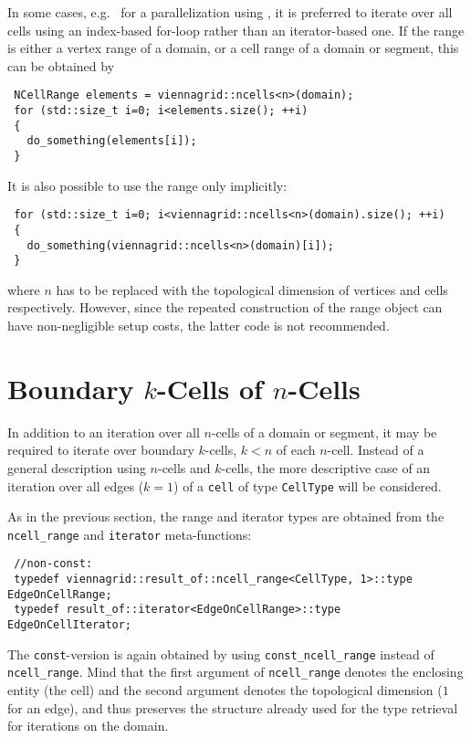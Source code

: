 In some cases, e.g.~ for a parallelization using \OpenMP \cite{openmp}, it is preferred to iterate over all cells using an index-based for-loop rather than an iterator-based one.
If the range is either a vertex range of a domain, or a cell range of a domain or segment, this can be obtained by
\begin{lstlisting}
 NCellRange elements = viennagrid::ncells<n>(domain);
 for (std::size_t i=0; i<elements.size(); ++i)
 { 
   do_something(elements[i]);
 }
\end{lstlisting}
It is also possible to use the range only implicitly:
\begin{lstlisting}
 for (std::size_t i=0; i<viennagrid::ncells<n>(domain).size(); ++i)
 {
   do_something(viennagrid::ncells<n>(domain)[i]);
 }
\end{lstlisting}
where $n$ has to be replaced with the topological dimension of vertices and cells respectively. However, since the repeated construction of the range object can have non-negligible setup costs, the latter code is not recommended.



\section{Boundary $k$-Cells of $n$-Cells}
In addition to an iteration over all $n$-cells of a domain or segment, it may be required to iterate over boundary $k$-cells, $k<n$ of each $n$-cell.
Instead of a general description using $n$-cells and $k$-cells, the more descriptive case of an iteration over all edges ($k=1$) of a \lstinline|cell| of type \lstinline|CellType| will be considered.


As in the previous section, the range and iterator types are obtained from the \lstinline|ncell_range| and \lstinline|iterator| meta-functions:
\begin{lstlisting}
 //non-const:
 typedef viennagrid::result_of::ncell_range<CellType, 1>::type    EdgeOnCellRange;
 typedef result_of::iterator<EdgeOnCellRange>::type          EdgeOnCellIterator;
\end{lstlisting}
The \lstinline|const|-version is again obtained by using \lstinline|const_ncell_range| instead of \lstinline|ncell_range|.
Mind that the first argument of \lstinline|ncell_range| denotes the enclosing entity (the cell) and the second argument denotes the topological dimension ($1$ for an edge), and thus preserves the structure already used for the type retrieval for iterations on the domain.

